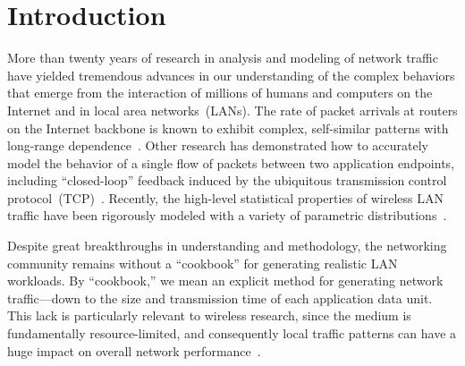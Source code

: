 \documentclass[twocolumn,final]{svjour3}
\newcommand{\caps}[1]{{\small{#1}}}
\begin{document}
\section{Introduction}\label{sec:intro}



More than twenty years of research in analysis and modeling of network traffic have yielded tremendous advances in our understanding of the complex behaviors that emerge from the interaction of millions of humans and computers on the Internet and in local area networks~(\caps{LAN}s). The rate of packet arrivals at routers on the Internet backbone is known to exhibit complex, self-similar patterns with long-range dependence~\cite{Paxson95,Paxson96,Willinger98}. Other research has demonstrated how to accurately model the behavior of a single flow of packets between two application endpoints, including ``closed-loop'' feedback induced by the ubiquitous transmission control protocol~(\caps{TCP})~\cite{Hernandez06:dissertation}. Recently, the high-level statistical properties of wireless \caps{LAN} traffic have been rigorously modeled with a variety of parametric distributions~\cite{Hernandez06:wlan-traffic}.

Despite great breakthroughs in understanding and methodology, the networking community remains without a ``cookbook'' for generating realistic \caps{LAN} workloads. By ``cookbook,'' we mean an explicit method for generating network traffic---down to the size and transmission time of each application data unit. This lack is particularly relevant to wireless research, since the medium is fundamentally resource-limited, and consequently local traffic patterns can have a huge impact on overall network performance~\cite{Karpinski07:realism,Karpinski07:cbr-failure}.
\end{document}
